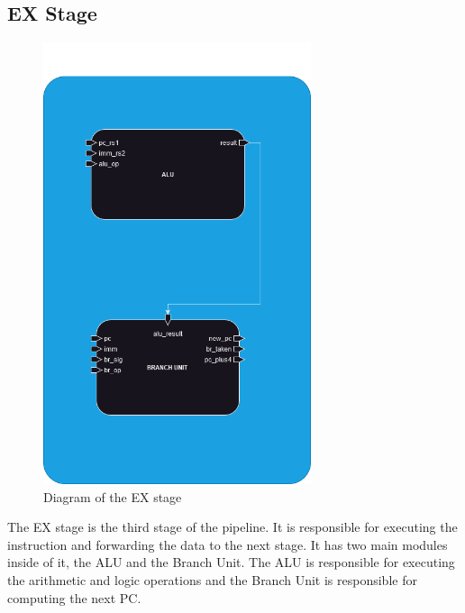 \subsection{EX Stage}

\begin{figure}[H]
\centering
\includegraphics[width=0.70\textwidth]{../diagrams/execute/ex_stage.png}
\caption{Diagram of the EX stage}
\label{fig:ex_stage}
\end{figure}

The EX stage is the third stage of the pipeline. It is responsible for executing the instruction and forwarding the data to the next stage.
It has two main modules inside of it, the ALU and the Branch Unit. The ALU is responsible for executing the arithmetic and logic operations
and the Branch Unit is responsible for computing the next PC.